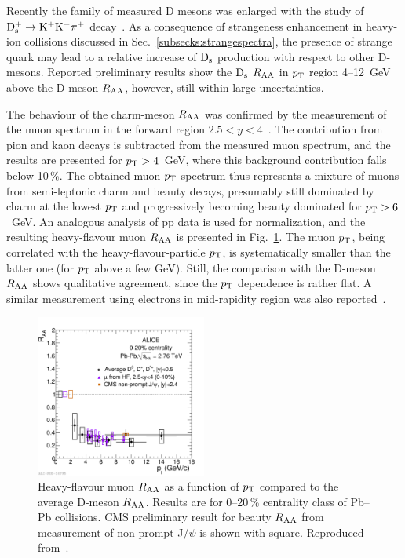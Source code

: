 Recently the family of measured D mesons was enlarged with the study of ${\rm D}_{\rm s}^+ \rightarrow {\rm K}^+{\rm K}^-\pi^+$ decay~\cite{Abelev:2012tca}. As a consequence of strangeness enhancement in heavy-ion collisions discussed in Sec.~\ref{subsecks:strangespectra}, the presence of strange quark may lead to a relative increase of ${\rm D}_{\rm s}$ production with respect to other D-mesons. Reported preliminary results show the ${\rm D}_{\rm s}$ $R_{\rm AA}$ in $p_{\rm T}$ region 4--12~GeV above the D-meson $R_{\rm AA}$, however, still within large uncertainties.

The behaviour of the charm-meson $R_{\rm AA}$ was confirmed by the measurement of the muon spectrum in the forward region $2.5 < y < 4$~\cite{Abelev:2012qh}. The contribution from pion and kaon decays is subtracted from the measured muon spectrum, and the results are presented for $p_{\rm T} > 4$~GeV, where this background contribution falls below 10\,\%. The obtained muon $p_{\rm T}$ spectrum thus represents a mixture of muons from semi-leptonic charm and beauty decays, presumably still dominated by charm at the lowest $p_{\rm T}$ and progressively becoming beauty dominated for $p_{\rm T} > 6$~GeV. An analogous  analysis of pp data is used for normalization, and the resulting heavy-flavour muon $R_{\rm AA}$ is presented in Fig.~\ref{figks:HFmuonRAA}. The muon $p_{\rm T}$, being correlated with the heavy-flavour-particle $p_{\rm T}$, is systematically smaller than the latter one (for $p_{\rm T}$ above a few GeV). Still, the comparison with the D-meson $R_{\rm AA}$ shows qualitative agreement, since the $p_{\rm T}$ dependence is rather flat. A similar measurement using electrons in mid-rapidity region was also reported~\cite{Abelev:2012xe}.

\begin{figure}
\centering
\includegraphics[width=0.5\textwidth]{ksfigures/DmesonHFmuonBRAA.pdf}
\caption{Heavy-flavour muon $R_{\rm AA}$ as a function of $p_{\rm T}$ compared to the average D-meson $R_{\rm AA}$. Results are for 0--20\,\% centrality class of Pb--Pb collisions. CMS preliminary result for beauty $R_{\rm AA}$ from measurement of non-prompt J/$\psi$ is shown with square. Reproduced from~\cite{Abelev:2012qh}.}
\label{figks:HFmuonRAA}
\end{figure}

